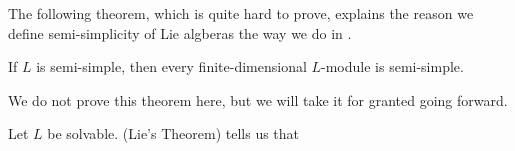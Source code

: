 The following theorem, which is quite hard to prove, explains the reason we define semi-simplicity of Lie algberas the way we do in .

\begin{boxtheorem}\label{Ch2:Thm:SemiSimpleLieToModule}
    If $L$ is semi-simple, then every finite-dimensional $L$-module is semi-simple.
\end{boxtheorem}

We do not prove this theorem here, but we will take it for granted going forward.

\begin{boxexample}
    Let $L$ be solvable.  (Lie's Theorem) tells us that 
\end{boxexample}
